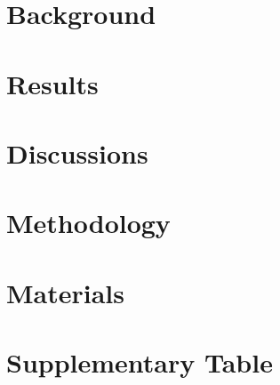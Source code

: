 \documentclass[
     12pt,         %
     a4paper,      %
     BCOR10mm,     %
     DIV14,        %
     listof=totoc,   %
     bibliography=totoc,     %
     index=totoc,     %
     ]{scrreprt}   %
\begin{document}
\listoffigures
\listoftables


 
%
\clearpage
{}


\chapter{Background}\label{bg}


\chapter{Results}\label{result}


\chapter{Discussions}\label{discuss}


\chapter{Methodology}\label{Method}


%

\appendix
\chapter{Materials}\label{app:material}

\newpage

\chapter{Supplementary Table}\label{app:suppl}

\newpage
%
%
\printbibliography %
\newpage
\printglossaries
\end{document}
